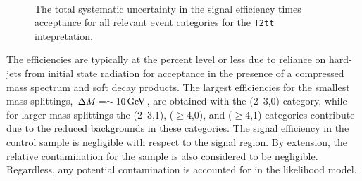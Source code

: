 \begin{figure}[h!]
  \begin{center}
    \\       
    \caption{\label{fig:sms-total-t2tt}The total systematic
      uncertainty in the signal efficiency times acceptance for all
      relevant event categories for the \texttt{T2tt} intepretation.}
  \end{center}
\end{figure}


The efficiencies are typically at the percent level or less due to
reliance on hard-\Pt jets from initial state radiation for acceptance
in the presence of a compressed mass spectrum and soft decay
products. The largest efficiencies for the smallest mass splittings,
$\Delta M = \sim10\,\text{Ge\hspace{-.08em}V}$, are obtained with the (2--3,0) category,
while for larger mass splittings the (2--3,1), ($\geq 4$,0), and
($\geq 4$,1) categories contribute due to the reduced backgrounds in
these categories. The signal efficiency in the \mj control sample is
negligible with respect to the signal region. By extension, the
relative contamination for the \mmj sample is also considered to be
negligible. Regardless, any potential contamination is accounted for
in the likelihood model.

